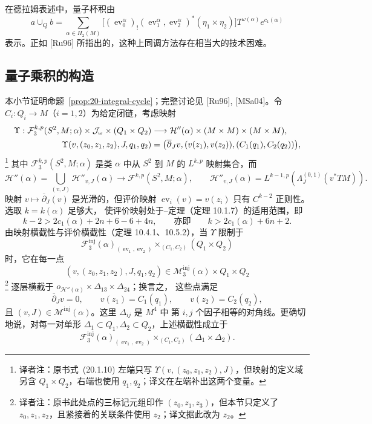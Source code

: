 在德拉姆表述中，量子杯积由
\begin{equation}
 a\cup_Qb=\sum_{\alpha\in H_2(M)}
 \bigl[(\operatorname{ev}_0^\alpha)_!
 (\operatorname{ev}_1^\alpha,\operatorname{ev}_2^\alpha)^*(\eta_1\times\eta_2)\bigr]
 T^{\omega(\alpha)}e^{c_1(\alpha)}
 \label{eq:20-derham-quantum-cup}
\end{equation}
表示。正如\personRuan{} [Ru96] 所指出的，这种上同调方法存在相当大的技术困难。

\subsection{量子乘积的构造}

本小节证明命题~\ref{prop:20-integral-cycle}；完整讨论见 [Ru96], [MSa04]。令
$C_i:Q_i\to M$（$i=1,2$）为给定闭链，考虑映射
\begin{align}
 \Upsilon:\mathcal F_3^{k,p}(S^2,M;\alpha)\times\mathcal J_\omega\times(Q_1\times Q_2)
 &\longrightarrow \mathcal H''(\alpha)\times(M\times M)\times(M\times M),\notag\\
 \Upsilon(v,(z_0,z_1,z_2),J,q_1,q_2)
 &=\bigl(\overline\partial_Jv,(v(z_1),v(z_2)),(C_1(q_1),C_2(q_2))\bigr),
 \label{eq:20-upsilon}
\end{align}
\footnote{译者注：原书式~(20.1.10) 左端只写
$\Upsilon(v,(z_0,z_1,z_2),J)$，但映射的定义域另含 $Q_1\times Q_2$，右端也使用
$q_1,q_2$；译文在左端补出这两个变量。}
其中 $\mathcal F_3^{k,p}(S^2,M;\alpha)$ 是类 $\alpha$ 中从 $S^2$ 到 $M$ 的
$L^{k,p}$ 映射集合，而
\[
 \mathcal H''(\alpha)=\bigcup_{(v,J)}\mathcal H''_{v,J}(\alpha)
 \longrightarrow\mathcal F^{k,p}(S^2,M;\alpha),\qquad
 \mathcal H''_{v,J}(\alpha)=L^{k-1,p}(\Lambda_J^{(0,1)}(v^*TM)).
\]
映射 $v\mapsto\overline\partial_J(v)$ 是光滑的，但评价映射
$\operatorname{ev}_i(v)=v(z_i)$ 只有 $C^{k-2}$ 正则性。选取 $k=k(\alpha)$ 足够大，
使评价映射处于\personSard{}--\personSmale{}定理（定理 10.1.7）的适用范围，即
\[
 k-2>2c_1(\alpha)+2n+6-6+4n,
 \qquad\text{亦即}\qquad k>2c_1(\alpha)+6n+2.
\]
由映射横截性与评价横截性（定理 10.4.1、10.5.2），当 $\Upsilon$ 限制于
\[
 \mathcal F_3^{\mathrm{inj}}(\alpha)_{(\operatorname{ev}_1,\operatorname{ev}_2)}
 \times_{(C_1,C_2)}(Q_1\times Q_2)
\]
时，它在每一点
\[
 (v,(z_0,z_1,z_2),J,q_1,q_2)\in
 \mathcal M_3^{\mathrm{inj}}(\alpha)\times Q_1\times Q_2
\]
\footnote{译者注：原书此处点的三标记元组印作 $(z_0,z_1,z_3)$，但本节只定义了
$z_0,z_1,z_2$，且紧接着的关联条件使用 $z_2$；译文据此改为 $z_2$。}
逐层横截于 $o_{\mathcal H''(\alpha)}\times\Delta_{13}\times\Delta_{24}$；换言之，
这些点满足
\begin{equation}
 \overline\partial_Jv=0,\qquad v(z_1)=C_1(q_1),\qquad v(z_2)=C_2(q_2),
 \label{eq:20-incidence-equations}
\end{equation}
且 $(v,J)\in\mathcal M^{\mathrm{inj}}(\alpha)$。这里 $\Delta_{ij}$ 是 $M^4$ 中
第 $i,j$ 个因子相等的对角线。更确切地说，对每一对单形
$\Delta_1\subset Q_1,\Delta_2\subset Q_2$，上述横截性成立于
\[
 \mathcal F_3^{\mathrm{inj}}(\alpha)_{(\operatorname{ev}_1,\operatorname{ev}_2)}
 \times_{(C_1,C_2)}(\Delta_1\times\Delta_2).
\]

